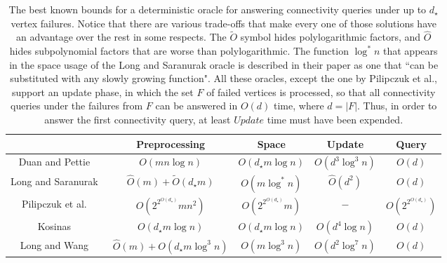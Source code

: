 \documentclass[11pt,a4paper]{article}
\begin{document}
\begin{table*}[h]
 \centering
 \hspace*{-0.35cm}
\renewcommand{\arraystretch}{1.3}
\begin{tabular}{ |c|c|c|c|c| } 
 \hline
 {} & Preprocessing & Space & Update & Query\\ \hline\hline
 {Duan and Pettie~\cite{DBLP:journals/siamcomp/DuanP20}} & $O(mn\log n)$ & $O(d_{\star}m\log n)$ & $O(d^3\log^3{n})$ & $O(d)$ \\ \hline
 {Long and Saranurak~\cite{DBLP:conf/focs/LongS22}} & $\hat{O}(m)+\tilde{O}(d_{\star}m)$ & $O(m\log^{*}{n})$ & $\hat{O}(d^2)$ & $O(d)$\\ \hline
 {Pilipczuk et al.~\cite{DBLP:conf/icalp/PilipczukSSTV22}} & $O(2^{2^{O(d_{\star})}}mn^2)$ & $O(2^{2^{O(d_{\star})}}m)$ & $-$ & $O(2^{2^{O(d_{\star})}})$\\ \hline
 {Kosinas~\cite{DBLP:conf/esa/Kosinas23}} & $O(d_{\star}m\log n)$ & $O(d_{\star}m\log n)$ & $O(d^4\log n)$ & $O(d)$\\ \hline
 {Long and Wang~\cite{DBLP:conf/icalp/LongW24}} & $\hat{O}(m)+O(d_{\star}m\log^3{n})$ & $O(m\log^3{n})$ & $O(d^2\log^7{n})$ & $O(d)$\\ \hline

\end{tabular}
 \caption{The best known bounds for a deterministic oracle for answering connectivity queries under up to $d_{\star}$ vertex failures. Notice that there are various trade-offs that make every one of those solutions have an advantage over the rest in some respects. The $\widetilde{O}$ symbol hides polylogarithmic factors, and $\widehat{O}$ hides subpolynomial factors that are worse than polylogarithmic. The function $\log^{*}{n}$ that appears in the space usage of the Long and Saranurak oracle is described in their paper as one that ``can be substituted with any slowly growing function". All these oracles, except the one by Pilipczuk et al., support an update phase, in which the set $F$ of failed vertices is processed, so that all connectivity queries under the failures from $F$ can be answered in $O(d)$ time, where $d=|F|$. Thus, in order to answer the first connectivity query, at least $\mathit{Update}$ time must have been expended. \label{table:bounds1}}
\end{table*} 
\end{document}
